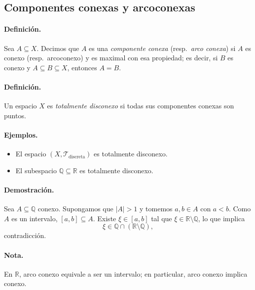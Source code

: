

\subsection{Componentes conexas y arcoconexas}

\paragraph{\textbf{Definición.}}
Sea $A\subseteq X$.  
Decimos que $A$ es una \emph{componente conexa} (resp.\ \emph{arco conexa}) si $A$ es conexo (resp.\ arcoconexo) y es maximal con esa propiedad; es decir, si $B$ es conexo y $A\subseteq B\subseteq X$, entonces $A=B$.

\paragraph{\textbf{Definición.}}
Un espacio $X$ es \emph{totalmente disconexo} si todas sus componentes conexas son puntos.

\paragraph{\textbf{Ejemplos.}}
\begin{itemize}
  \item El espacio $(X,\mathcal T_{\text{discreta}})$ es totalmente disconexo.
  \item El subespacio $\mathbb Q\subseteq\mathbb R$ es totalmente disconexo.
\end{itemize}

\paragraph{\textbf{Demostración.}}
Sea $A\subseteq\mathbb Q$ conexo.  
Supongamos que $|A|>1$ y tomemos $a,b\in A$ con $a<b$.  
Como $A$ es un intervalo, $[a,b]\subseteq A$.  
Existe $\xi\in[a,b]$ tal que $\xi\in\mathbb R\setminus\mathbb Q$, lo que implica
\[
\xi\in\mathbb Q\cap(\mathbb R\setminus\mathbb Q),
\]
contradicción.

\paragraph{\textbf{Nota.}}
En $\mathbb R$, arco conexo equivale a ser un intervalo; en particular, arco conexo implica conexo.

